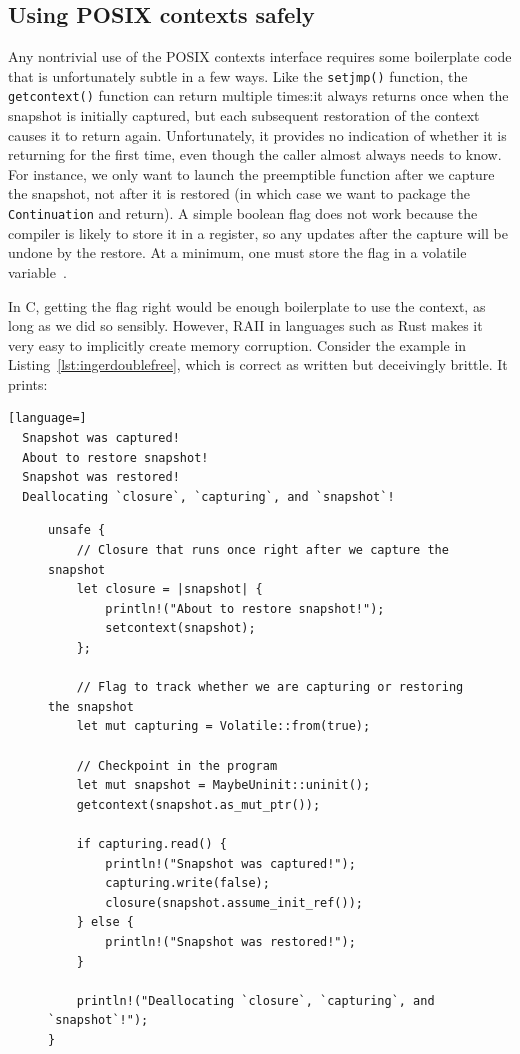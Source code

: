\subsection{Using POSIX contexts safely}

Any nontrivial use of the POSIX contexts interface requires some boilerplate code
that is unfortunately subtle in a few ways.  Like the \texttt{setjmp()} function, the
\texttt{getcontext()} function can return multiple times:\@ it always returns once
when the snapshot is initially captured, but each subsequent restoration of the
context causes it to return again.  Unfortunately, it provides no indication of
whether it is returning for the first time, even though the caller almost always
needs to know.  For instance, we only want to launch the preemptible function after
we capture the snapshot, not after it is restored (in which case we want to package
the \texttt{Continuation} and return).  A simple boolean flag does not work because
the compiler is likely to store it in a register, so any updates after the capture
will be undone by the restore.  At a minimum, one must store the flag in a volatile
variable~\cite{getcontext-manpage}.

In C, getting the flag right would be enough boilerplate to use the context, as long
as we did so sensibly.  However, RAII in languages such as Rust makes it very easy to
implicitly create memory corruption.  Consider the example in
Listing~\ref{lst:ingerdoublefree}, which is correct as written but deceivingly
brittle.  It prints:
\begin{lstlisting}[language=]
  Snapshot was captured!
  About to restore snapshot!
  Snapshot was restored!
  Deallocating `closure`, `capturing`, and `snapshot`!
\end{lstlisting}

\begin{figure}
\begin{lstlisting}[label=lst:ingerdoublefree,caption=Subtly unsound use of POSIX contexts from Rust,morekeywords={let,mut,unsafe}]
unsafe {
	// Closure that runs once right after we capture the snapshot
	let closure = |snapshot| {
		println!("About to restore snapshot!");
		setcontext(snapshot);
	};

	// Flag to track whether we are capturing or restoring the snapshot
	let mut capturing = Volatile::from(true);

	// Checkpoint in the program
	let mut snapshot = MaybeUninit::uninit();
	getcontext(snapshot.as_mut_ptr());

	if capturing.read() {
		println!("Snapshot was captured!");
		capturing.write(false);
		closure(snapshot.assume_init_ref());
	} else {
		println!("Snapshot was restored!");
	}

	println!("Deallocating `closure`, `capturing`, and `snapshot`!");
}
\end{lstlisting}
\end{figure}

